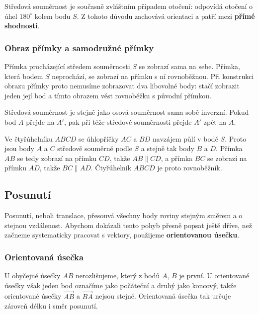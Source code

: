 \documentclass[12pt,a4paper]{article}
\begin{document}
Středová souměrnost je současně zvláštním případem otočení: odpovídá otočení o úhel $180^\circ$ kolem bodu $S$. Z tohoto důvodu zachovává orientaci a patří mezi \textbf{přímé shodnosti}.




\subsubsection*{Obraz přímky a samodružné přímky}

Přímka procházející středem souměrnosti $S$ se zobrazí sama na sebe. Přímka, která bodem $S$ neprochází, se zobrazí na přímku s ní rovnoběžnou. Při konstrukci obrazu přímky proto nemusíme zobrazovat dva libovolné body: stačí zobrazit jeden její bod a tímto obrazem vést rovnoběžku s původní přímkou.

Středová souměrnost je stejně jako osová souměrnost sama sobě inverzní. Pokud bod $A$ přejde na $A'$, pak při téže středové souměrnosti přejde $A'$ zpět na $A$.

\begin{examplebox}
    Ve čtyřúhelníku $ABCD$ se úhlopříčky $AC$ a $BD$ navzájem půlí v bodě $S$. Proto jsou body $A$ a $C$ středově souměrné podle $S$ a stejně tak body $B$ a $D$. Přímka $AB$ se tedy zobrazí na přímku $CD$, takže $AB\parallel CD$, a přímka $BC$ se zobrazí na přímku $AD$, takže $BC\parallel AD$. Čtyřúhelník $ABCD$ je proto rovnoběžník.
\end{examplebox}


\subsection{Posunutí}

Posunutí, neboli translace, přesouvá všechny body roviny stejným směrem a o stejnou vzdálenost. Abychom dokázali tento pohyb přesně popsat ještě dříve, než začneme systematicky pracovat s vektory, použijeme \textbf{orientovanou úsečku}.

\subsubsection*{Orientovaná úsečka}

U obyčejné úsečky $AB$ nerozlišujeme, který z bodů $A$, $B$ je první. U orientované úsečky však jeden bod označíme jako počáteční a druhý jako koncový, takže orientované úsečky $\overrightarrow{AB}$ a $\overrightarrow{BA}$ nejsou stejné. Orientovaná úsečka tak určuje zároveň délku i směr posunutí.
\end{document}
